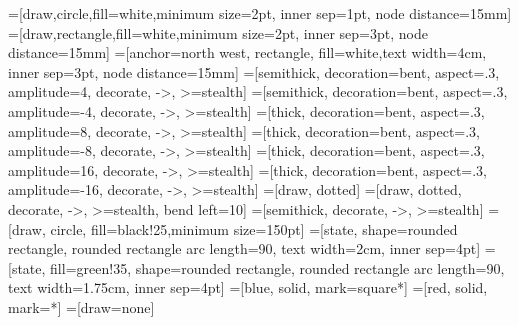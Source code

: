 \usepackage{pgf}
\usepackage{tikz}
\usetikzlibrary{decorations.pathmorphing} %
\usetikzlibrary{positioning}
\usetikzlibrary{er}
\usetikzlibrary{automata}
\usetikzlibrary{shapes.geometric}
\usetikzlibrary{shapes.misc}
=[draw,circle,fill=white,minimum size=2pt, inner sep=1pt, node distance=15mm]
=[draw,rectangle,fill=white,minimum size=2pt, inner sep=3pt, node distance=15mm]
=[anchor=north west, rectangle, fill=white,text width=4cm, inner sep=3pt, node distance=15mm]
=[semithick, decoration={bent, aspect=.3, amplitude=4}, decorate, ->, >=stealth]
=[semithick, decoration={bent, aspect=.3, amplitude=-4}, decorate, ->, >=stealth]
=[thick, decoration={bent, aspect=.3, amplitude=8}, decorate, ->, >=stealth]
=[thick, decoration={bent, aspect=.3, amplitude=-8}, decorate, ->, >=stealth]
=[thick, decoration={bent, aspect=.3, amplitude=16}, decorate, ->, >=stealth]
=[thick, decoration={bent, aspect=.3, amplitude=-16}, decorate, ->, >=stealth]
=[draw, dotted]
=[draw, dotted, decorate, ->, >=stealth, bend left=10]
=[semithick, decorate, ->, >=stealth]
=[draw, circle, fill=black!25,minimum size=150pt]
=[state, shape=rounded rectangle, rounded rectangle arc length=90, text width=2cm, inner sep=4pt]
=[state, fill=green!35, shape=rounded rectangle, rounded rectangle arc length=90, text width=1.75cm, inner sep=4pt]
=[blue, solid, mark=square*]
=[red, solid, mark=*]
=[draw=none]
